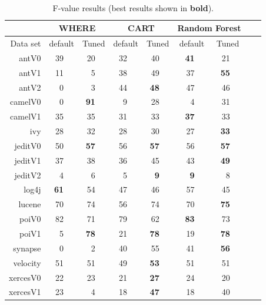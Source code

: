 \documentclass{sig-alternative}
\begin{document}
\begin{table}[!t]
\renewcommand{\baselinestretch}{0.8} 

\scriptsize  
~~~\begin{tabular}{r|rl|rl|rl|rl|rl|rlrl}
      &   \multicolumn{4}{c|}{WHERE}         &   \multicolumn{4}{c|}{CART}         &   \multicolumn{4}{c}{Random Forest}         \\\hline
  Data set   &   \multicolumn{2}{c}{default}         &   \multicolumn{2}{c|}{Tuned}         &   \multicolumn{2}{c}{default}         &   \multicolumn{2}{c|}{Tuned}    &   \multicolumn{2}{c}{default}  &   \multicolumn{2}{c}{Tuned}\\\hline
antV0 & 39 &   & 20 &   & 32 &   & 40 &   & {\bf 41} &   & 21 &  \\
antV1 & 11 &   & 5 &   & 38 &   & 49 &   & 37 &   & {\bf 55} &  \\
antV2 & 0 &   & 3 &   & 44 &   & {\bf 48} &   & 47 &   & 46 &  \\
camelV0 & 0 &   & {\bf 91} &   & 9 &   & 28 &   & 4 &   & 31 &  \\
camelV1 & 35 &   & 35 &   & 31 &   & 33 &   & {\bf 37} &   & 33 &  \\
ivy & 28 &   & 32 &   & 28 &   & 30 &   & 27 &   & {\bf 33} &  \\
jeditV0 & 50 &   & {\bf 57} &   & 56 &   & {\bf 57} &   & 56 &   & {\bf 57} &  \\
jeditV1 & 37 &   & 38 &   & 36 &   & 45 &   & 43 &   & {\bf 49} &  \\
jeditV2 & 4 &   & 6 &   & 5 &   & {\bf 9} &   & {\bf 9} &   & 8 &  \\
log4j & {\bf 61} &   & 54 &   & 47 &   & 46 &   & 57 &   & 45 &  \\
lucene & 70 &   & 74 &   & 56 &   & 74 &   & 70 &   & {\bf 75} &  \\
poiV0 & 82 &   & 71 &   & 79 &   & 62 &   & {\bf 83} &   & 73 &  \\
poiV1 & 5 &   & {\bf 78} &   & 21 &   & {\bf 78} &   & 19 &   & {\bf 78} &  \\
synapse & 0 &   & 2 &   & 40 &   & 55 &   & 41 &   & {\bf 56} &  \\
velocity & 51 &   & 51 &   & 49 &   & {\bf 53} &   & 51 &   & 51 &  \\
xercesV0 & 22 &   & 23 &   & 21 &   & {\bf 27} &   & 24 &   & 20 &  \\
xercesV1 & 23 &   & 4 &   & 18 &   & {\bf 47} &   & 18 &   & 40 &  \\
\end{tabular}
\caption{F-value results (best results  shown in {\bf bold}).}
\label{tab:fbars}
\end{table}
\end{document}
